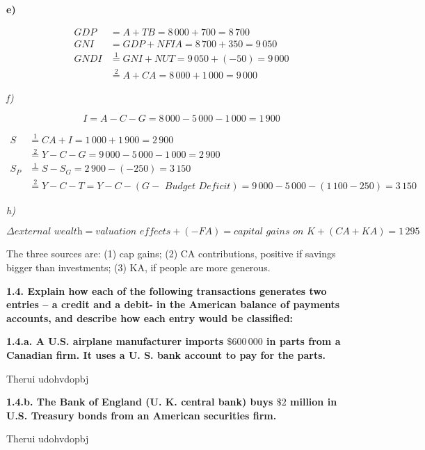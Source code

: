 \documentclass[11pt, a4paper]{article}
\begin{document}
\textbf{e)}

\begin{align*}
   GDP &= A + TB = 8\,000 + 700 = 8\,700 \\
   GNI &= GDP + NFIA = 8\,700 + 350 = 9\,050\\
   GNDI &\overset{1}{=} GNI + NUT = 9\,050 + (-50) = 9\,000\\
   &\overset{2}{=} A + CA = 8\,000+1\,000 = 9\,000
\end{align*}

\textit{f)}

$$ I = A - C - G = 8\,000-5\,000-1\,000 = 1\,900$$


\begin{align*}
   S &\overset{1}{=} CA + I = 1\,000 + 1\,900 = 2\,900 \\
   &\overset{2}{=} Y - C - G = 9\,000 - 5\,000 - 1\,000 = 2\,900\\
   S_P &\overset{1}{=} S - S_G = 2\,900 - (-250) = 3\,150\\
   &\overset{2}{=} Y -C-T=Y-C-(G-\textit{ Budget Deficit}) = 9\,000-5\,000 - (1\,100 - 250) = 3\,150
\end{align*}

\textit{h)}

$$\Delta \textit{external wealth} = \textit{valuation effects} + (-FA) =  \textit{capital gains on K} + (CA + KA) = 1\,295$$

The three sources are: (1) cap gains; (2) CA contributions, positive if savings bigger than investments; (3) KA, if people are more generous.

\clearpage

\textbf{1.4. Explain how each of the following transactions generates two entries – a credit and a debit- in the American balance of payments accounts, and describe how each entry would be classified: }

\textbf{1.4.a.  A U.S. airplane manufacturer imports $\$600\,000$ in parts from a Canadian firm. It uses a U. S. bank account to pay for the parts.}

\vspace{0.075in}
Therui udohvdopbj
\vspace{0.075in}

\textbf{1.4.b. The Bank of England (U. K. central bank) buys $\$2$ million in U.S. Treasury bonds
from an American securities firm.}

\vspace{0.075in}
Therui udohvdopbj
\vspace{0.075in}
\end{document}
